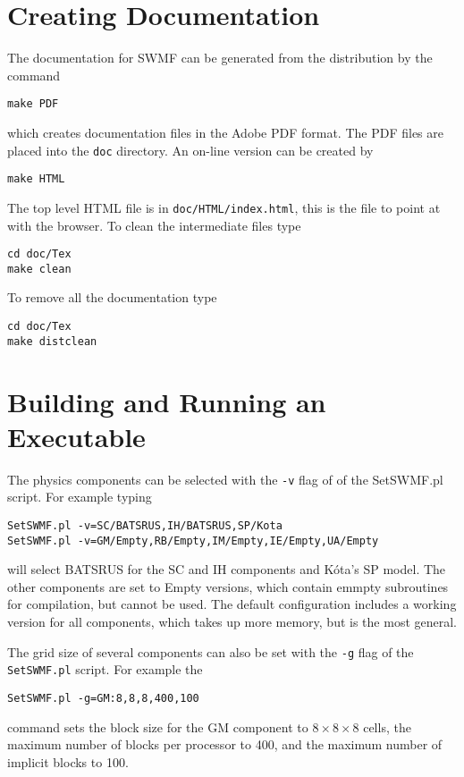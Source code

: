\section{Creating Documentation}

The documentation for SWMF can be generated from the distribution by
the command
\begin{verbatim}
make PDF
\end{verbatim}
which creates documentation files in the Adobe PDF format.  The PDF
files are placed into the {\tt doc} directory.  An on-line version can
be created by
\begin{verbatim}
make HTML
\end{verbatim}
The top level HTML file is in {\tt doc/HTML/index.html}, this is the file
to point at with the browser.  To clean the intermediate files type
\begin{verbatim}
cd doc/Tex
make clean
\end{verbatim}
To remove all the documentation type
\begin{verbatim}
cd doc/Tex
make distclean
\end{verbatim}

\section{Building and Running an Executable}

The physics components can be selected with the {\tt -v} flag
of of the SetSWMF.pl script. For example typing
\begin{verbatim}
SetSWMF.pl -v=SC/BATSRUS,IH/BATSRUS,SP/Kota
SetSWMF.pl -v=GM/Empty,RB/Empty,IM/Empty,IE/Empty,UA/Empty
\end{verbatim}
will select BATSRUS for the SC and IH components and K\'ota's SP model.
The other components are set to Empty versions, which contain emmpty
subroutines for compilation, but cannot be used.
The default configuration includes a working version for all components, 
which takes up more memory, but is the most general.

The grid size of several components can also be set with the {\tt -g}
flag of the {\tt SetSWMF.pl} script. For example the 
\begin{verbatim}
SetSWMF.pl -g=GM:8,8,8,400,100
\end{verbatim}
command sets the block size for the GM component to $8\times 8\times 8$ cells, 
the maximum number of blocks per processor to 400, 
and the maximum number of implicit blocks to 100.

